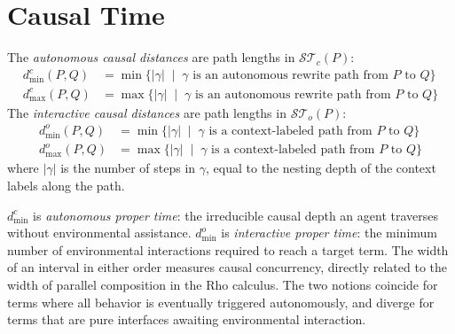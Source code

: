 \section{Causal Time}

\begin{definition}
The \emph{autonomous causal distances} are path lengths in
$\mathcal{ST}_c(P)$:
\begin{align}
  d^c_{\min}(P, Q) &= \min\bigl\{|\gamma| \;\mid\;
    \gamma \text{ is an autonomous rewrite path from } P \text{ to } Q\bigr\} \\
  d^c_{\max}(P, Q) &= \max\bigl\{|\gamma| \;\mid\;
    \gamma \text{ is an autonomous rewrite path from } P \text{ to } Q\bigr\}
\end{align}
The \emph{interactive causal distances} are path lengths in
$\mathcal{ST}_o(P)$:
\begin{align}
  d^o_{\min}(P, Q) &= \min\bigl\{|\gamma| \;\mid\;
    \gamma \text{ is a context-labeled path from } P \text{ to } Q\bigr\} \\
  d^o_{\max}(P, Q) &= \max\bigl\{|\gamma| \;\mid\;
    \gamma \text{ is a context-labeled path from } P \text{ to } Q\bigr\}
\end{align}
where $|\gamma|$ is the number of steps in $\gamma$, equal to the
nesting depth of the context labels along the path.
\end{definition}

\begin{remark}
$d^c_{\min}$ is \emph{autonomous proper time}: the irreducible
causal depth an agent traverses without environmental assistance.
$d^o_{\min}$ is \emph{interactive proper time}: the minimum number
of environmental interactions required to reach a target term.
The width of an interval in either order measures causal
concurrency, directly related to the width of parallel composition
in the Rho calculus.
The two notions coincide for terms where all behavior is eventually
triggered autonomously, and diverge for terms that are pure
interfaces awaiting environmental interaction.
\end{remark}

